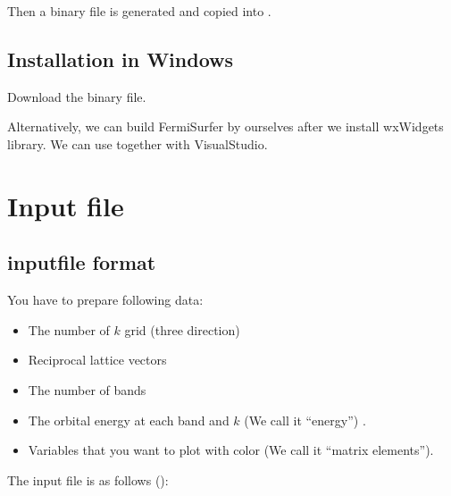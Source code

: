 \documentclass[letterpaper,10pt,pdftex,openany,english]{sphinxmanual}
\begin{document}
\sphinxAtStartPar
Then a binary file  is generated and
copied into .


\section{Installation in Windows}
\label{\detokenize{install:installation-in-windows}}
\sphinxAtStartPar
Download the binary file.

\sphinxAtStartPar
Alternatively, we can build FermiSurfer by ourselves
after we install wxWidgets library.
We can use  together with VisualStudio.

\sphinxstepscope


\chapter{Input file}
\label{\detokenize{input:input-file}}\label{\detokenize{input:input}}\label{\detokenize{input::doc}}

\section{input\sphinxhyphen{}file format}
\label{\detokenize{input:input-file-format}}
\sphinxAtStartPar
You have to prepare following data:
\begin{itemize}
\item {} 
\sphinxAtStartPar
The number of \(k\) grid (three direction)

\item {} 
\sphinxAtStartPar
Reciprocal lattice vectors

\item {} 
\sphinxAtStartPar
The number of bands

\item {} 
\sphinxAtStartPar
The orbital energy at each band and \(k\) (We call it “energy”) .

\item {} 
\sphinxAtStartPar
Variables that you want to plot with color (We call it “matrix
elements”).

\end{itemize}

\sphinxAtStartPar
The input file is as follows ():
\end{document}
